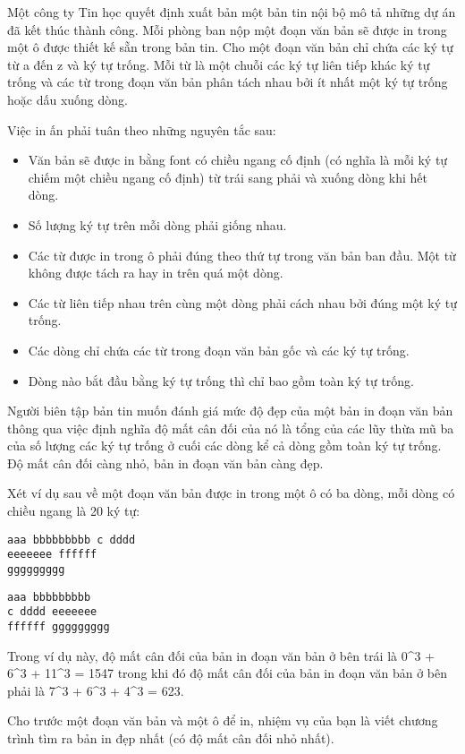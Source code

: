 Một công ty Tin học quyết định xuất bản một bản tin nội bộ mô tả những dự án đã kết thúc thành công. Mỗi phòng ban nộp một đoạn văn bản sẽ được in trong một ô được thiết kế sẵn trong bản tin. Cho một đoạn văn bản chỉ chứa các ký tự từ a đến z và ký tự trống. Mỗi từ là một chuỗi các ký tự liên tiếp khác ký tự trống và các từ trong đoạn văn bản phân tách nhau bởi ít nhất một ký tự trống hoặc dấu xuống dòng.  

   Việc in ấn phải tuân theo những nguyên tắc sau:  
\begin{itemize}
	\item     Văn bản sẽ được in bằng font có chiều ngang cố định (có nghĩa là mỗi ký tự chiếm một chiều ngang cố định) từ trái sang phải và xuống dòng khi hết dòng.   
	\item     Số lượng ký tự trên mỗi dòng phải giống nhau.   
	\item     Các từ được in trong ô phải đúng theo thứ tự trong văn bản ban đầu. Một từ không được tách ra hay in trên quá một dòng.   
	\item     Các từ liên tiếp nhau trên cùng một dòng phải cách nhau bởi đúng một ký tự trống.   
	\item     Các dòng chỉ chứa các từ trong đoạn văn bản gốc và các ký tự trống.   
	\item     Dòng nào bắt đầu bằng ký tự trống thì chỉ bao gồm toàn ký tự trống.   
\end{itemize}

   Người biên tập bản tin muốn đánh giá mức độ đẹp của một bản in đoạn văn bản thông qua việc định nghĩa  độ mất cân đối của nó là tổng của các lũy thừa mũ ba của số lượng các ký tự trống ở cuối các dòng kể cả dòng gồm toàn ký tự trống. Độ mất cân đối càng nhỏ, bản in đoạn văn bản càng đẹp.  

   Xét ví dụ sau về một đoạn văn bản được in trong một ô có ba dòng, mỗi dòng có chiều ngang là 20 ký tự:  
\begin{verbatim}
aaa bbbbbbbbb c dddd
eeeeeee ffffff
ggggggggg		
\end{verbatim}
\begin{verbatim}
aaa bbbbbbbbb      
c dddd eeeeeee       
ffffff ggggggggg
\end{verbatim}

   Trong ví dụ này, độ mất cân đối của bản in đoạn văn bản ở bên trái là 0^3 + 6^3 + 11^3 = 1547 trong khi đó độ mất cân đối của bản in đoạn văn bản ở bên phải là 7^3 + 6^3 + 4^3 = 623.  

   Cho trước một đoạn văn bản và một ô để in, nhiệm vụ của bạn là viết chương trình tìm ra bản in đẹp nhất (có độ mất cân đối nhỏ nhất).  

\